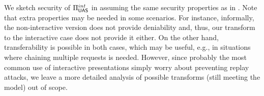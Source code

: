 We sketch security of $\Pi_{\mathsf{UAS}}^{int}$ in  assuming
the same security properties as in \UAS. Note that extra properties may be
needed in some scenarios. For instance, informally, the non-interactive version
does not provide deniability and, thus, our transform to the interactive case
does not provide it either. On the other hand, transferability is possible in
both cases, which may be useful, e.g., in situations where chaining multiple
requests is needed.
%
However, since probably the most common use of interactive presentations simply
worry about preventing replay attacks, we leave a more detailed analysis of
possible transforms (still meeting the \UAS model) out of scope.

